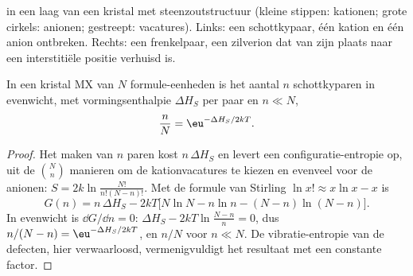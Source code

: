 \begin{omfigure}

{\small {} in een laag van een kristal met steenzoutstructuur
(kleine stippen: kationen; grote cirkels: anionen; gestreept: vacatures).
Links: een schottkypaar, één kation en één anion ontbreken. Rechts: een
frenkelpaar, een zilverion dat van zijn plaats naar een interstitiële
positie verhuisd is.}
\end{omfigure}

\begin{theorem}\label{thm:b3:solid-state:schottky}
In een kristal MX van $N$ formule-eenheden is het aantal $n$ schottkyparen in
evenwicht, met vormingsenthalpie $\Delta H_S$ per paar en $n \ll N$,
\[
  \frac{n}{N} = \eu^{-\Delta H_S/2kT}.
\]
\end{theorem}

\begin{proof}
Het maken van $n$ paren kost $n\,\Delta H_S$ en levert een configuratie-entropie op, uit de
$\binom{N}{n}$ manieren om de kationvacatures te kiezen en evenveel voor de anionen:
$S = 2k\ln\frac{N!}{n!(N - n)!}$. Met de formule van Stirling $\ln x! \approx x\ln x - x$ is
\[
  G(n) = n\,\Delta H_S - 2kT\bigl[N\ln N - n\ln n - (N - n)\ln(N - n)\bigr].
\]
In evenwicht is $\dd G/\dd n = 0$: $\Delta H_S - 2kT\ln\frac{N - n}{n} = 0$, dus $n/(N - n) = \eu^{-\Delta H_S/2kT}$, en $n/N$ voor
$n \ll N$. De vibratie-entropie van de defecten, hier verwaarloosd,
vermenigvuldigt het resultaat met een constante factor.
\end{proof}

